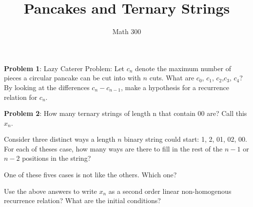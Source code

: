 \documentclass[11pt]{amsart}
\title{Pancakes and Ternary Strings}
\author{Math 300}
\newenvironment{packed_enum}{
\begin{enumerate}
  \setlength{\itemsep}{1pt}
  \setlength{\parskip}{0pt}
  \setlength{\parsep}{0pt}
}{\end{enumerate}}
\begin{document}
\maketitle


{\bf  Problem 1}:  Lazy Caterer Problem:  Let $c_n$ denote the maximum number of pieces a circular pancake can be cut into with $n$ cuts.  What are $c_0$, $c_1$, $c_2$,$c_3$, $c_4$?  By looking at the differences $c_n-c_{n-1}$, make a hypothesis for  a recurrence relation for $c_n$. \vfill

{\bf Problem 2}: How many ternary strings of length n that contain 00 are? Call this $x_n$. 
\begin{packed_enum}
\item Consider three distinct ways a length $n$ binary string could start: 1, 2,  01, 02, 00.  For each of theses case, how many ways are there to fill in the rest of the $n-1$ or $n-2$ positions in the string?  
\item One of these fives cases is not like the others.  Which one?
\item Use the above answers to write $x_n$ as a second order linear non-homogenous recurrence relation?  What are the initial conditions?
\end{packed_enum}
\vfill
\end{document}
